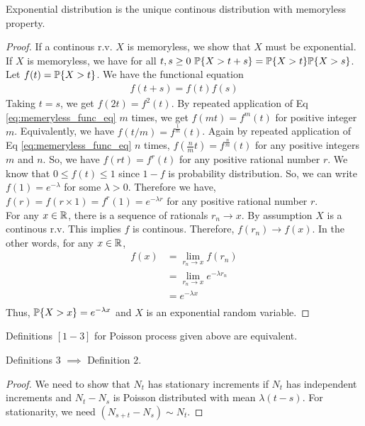 \documentclass[a4paper,10pt,english]{article}
\begin{document}
\begin{thm}[] 
Exponential distribution is the unique continous distribution with memoryless property.
\begin{proof}
If a continous r.v. $X$ is memoryless, we show that $X$ must be exponential. If $X$ is memoryless, we have for all $t,s\geq 0\ \P\{X>t+s\} = \P\{X>t\} \P\{X>s\}$. Let $f(t) = \P\{X>t\}$. We have the functional equation
\begin{align}
\label{eq:memeryless_func_eq}
f(t+s) = f(t) f(s)
\end{align}
Taking $t=s$, we get $f(2t) = f^2(t)$. By repeated application of Eq \ref{eq:memeryless_func_eq} $m$ times, we get $f(mt) = f^m(t)$ for positive integer $m$. Equivalently, we have $f(t/m) =f^{\frac{1}{m}}(t)$. Again by repeated application of Eq \ref{eq:memeryless_func_eq} $n$ times, $f(\frac{n}{m}t) =f^{\frac{n}{m}}(t)$ for any positive integers $m$ and $n$. So, we have $f(rt) = f^r(t)$ for any positive rational number $r$. We know that $0\leq f(t) \leq 1$ since $1-f$ is probability distribution. So, we can write $f(1) = e^{-\lambda}$ for some $\lambda > 0$. Therefore we have, $f(r) = f(r \times 1) = f^r(1) = e^{-\lambda r}$ for any positive rational number $r$. \\
\indent For any $x \in \R$, there is a sequence of rationals $r_n \rightarrow x$. By assumption $X$ is a continous r.v. This implies $f$ is continous. Therefore, $f(r_n) \rightarrow f(x)$. In the other words, for any $x \in \R$,
\begin{align*}
f(x) &= \lim_{r_n \rightarrow x} f(r_n) \\
 &= \lim_{r_n \rightarrow x} e^{-\lambda r_n} \\
 &= e^{-\lambda x} \\ 
\end{align*}
Thus, $\P\{X>x\} = e^{-\lambda x}$ and $X$ is an exponential random variable.
\end{proof}
\end{thm}

Definitions $[1-3]$ for Poisson process given above are equivalent. 

\begin{thm}[] 
Definitions $3$ $\implies$ Definition $2$.
\begin{proof}
We need to show that $N_t$ has stationary increments if $N_t$  has independent increments and $N_t-N_s$ is Poisson distributed with mean $\lambda(t-s)$. For stationarity, we need $(N_{s+t}-N_s) \sim N_t$. 
\end{proof}
\end{thm}
\end{document}
